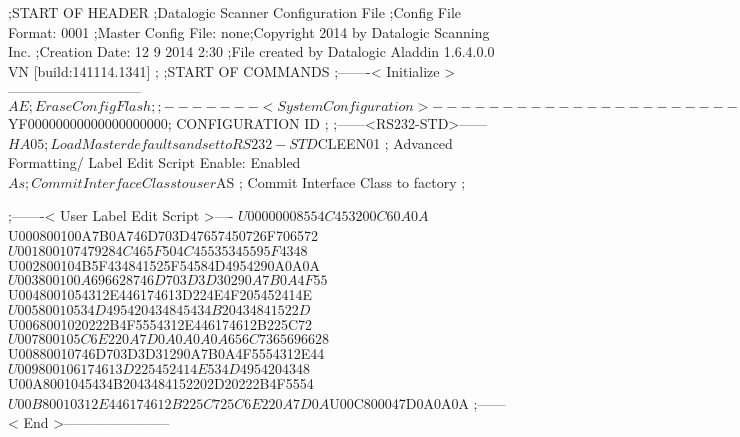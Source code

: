 ;START OF HEADER
;Datalogic Scanner Configuration File
;Config File Format: 0001
;Master Config File: none;Copyright 2014 by Datalogic Scanning Inc.
;Creation Date: 12 9 2014 2:30
;File created by Datalogic Aladdin 1.6.4.0.0 VN [build:141114.1341]
;
;START OF COMMANDS
;-------< Initialize >-----------------------------
$AE                 ; Erase Config Flash
;
;-------< System Configuration >-------------------------------
$YF00000000000000000000; CONFIGURATION ID
;
;------<RS232-STD>------
$HA05               ; Load Master defaults and set to RS232-STD
$CLEEN01            ; Advanced Formatting/ Label Edit Script Enable: Enabled
$As                 ; Commit Interface Class to user
$AS                 ; Commit Interface Class to factory
;

;-------< User Label Edit Script >----
$U00000008554C453200C60A0A
$U000800100A7B0A746D703D47657450726F706572
$U001800107479284C465F504C45535345595F4348
$U002800104B5F434841525F54584D4954290A0A0A
$U003800100A696628746D703D3D30290A7B0A4F55
$U0048001054312E446174613D224E4F205452414E
$U00580010534D495420434845434B20434841522D
$U0068001020222B4F5554312E446174612B225C72
$U007800105C6E220A7D0A0A0A0A656C7365696628
$U00880010746D703D3D31290A7B0A4F5554312E44
$U009800106174613D225452414E534D4954204348
$U00A8001045434B2043484152202D20222B4F5554
$U00B80010312E446174612B225C725C6E220A7D0A
$U00C800047D0A0A0A
;------< End >-----------------------
